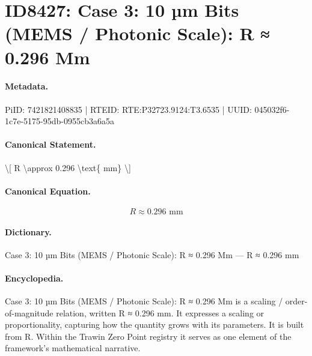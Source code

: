 \section*{ID8427: Case 3: 10 µm Bits (MEMS / Photonic Scale): R ≈ 0.296 Mm}
\paragraph{Metadata.}
PiID: 7421821408835 | RTEID: RTE:P32723.9124:T3.6535 | UUID: 045032f6-1c7e-5175-95db-0955cb3a6a5a

\paragraph{Canonical Statement.}
\textbackslash{}[ R \textbackslash{}approx 0.296 \textbackslash{}text\{ mm\} \textbackslash{}]

\paragraph{Canonical Equation.}
\[
R \approx 0.296 \text{ mm}
\]

\paragraph{Dictionary.}
Case 3: 10 µm Bits (MEMS / Photonic Scale): R ≈ 0.296 Mm — R ≈ 0.296 mm

\paragraph{Encyclopedia.}
Case 3: 10 µm Bits (MEMS / Photonic Scale): R ≈ 0.296 Mm is a scaling / order-of-magnitude relation, written R ≈ 0.296 mm. It expresses a scaling or proportionality, capturing how the quantity grows with its parameters. It is built from R. Within the Trawin Zero Point registry it serves as one element of the framework's mathematical narrative.

